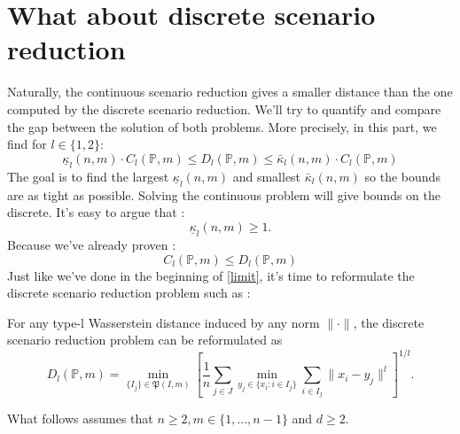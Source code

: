 \documentclass{amsart}
\begin{document}
\section{What about discrete scenario reduction}
Naturally, the continuous scenario reduction gives a smaller distance than the one computed by the discrete scenario reduction. We'll try to quantify and compare the gap between the solution of both problems. More precisely, in this part, we find for $l\in\{1,2\}$: 
$$\underline{\kappa}_l\left(n,m\right)\cdot C_l\left( \mathbb{P},m\right)\leq D_l\left(\mathbb{P},m\right)\leq \bar{\kappa}_l\left(n,m\right)\cdot C_l\left(\mathbb{P},m\right)$$
The goal is to find the largest $\underline{\kappa}_l\left(n,m\right)$ and smallest $\bar{\kappa}_l\left(n,m\right)$ so the bounds are as tight as possible. Solving the continuous problem will give bounds on the discrete. It's easy to argue that : 
$$
\underline\kappa_l\left(n,m\right)\geq1.
$$
Because we've already proven : 
$$
C_l\left( \mathbb{P},m\right)\leq D_l\left( \mathbb{P},m\right)
$$
Just like we've done in the beginning of \ref{limit}, it's time to reformulate the discrete scenario reduction problem such as :
\begin{theorem}\label{reformulation 2}
    For any type-l Wasserstein distance induced by any norm $\lVert\cdot\rVert$, the discrete scenario reduction problem can be reformulated as 
    $$
    D_l\left(\mathbb{P},m\right)=\min_{\{I_j\}\in\mathfrak{P}\left(I,m\right)}\left[ \frac{1}{n}\sum_{j\in J}\min_{y_j\in\{x_i : i\in I_j\}}\sum_{i\in I_j}\lVert x_i-y_j\rVert^l\right]^{1/l}.
    $$
\end{theorem}
What follows assumes that $n\geq2, m\in\{1,...,n-1\}$ and $d\geq2.$
\end{document}
